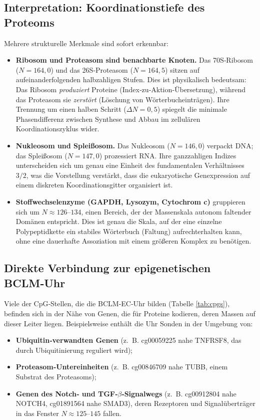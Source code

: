 \documentclass[12pt,a4paper]{article}
\begin{document}
	\subsection{Interpretation: Koordinationstiefe des Proteoms}
	
	Mehrere strukturelle Merkmale sind sofort erkennbar:
	\begin{itemize}
		\item \textbf{Ribosom und Proteasom sind benachbarte Knoten.} Das 70S‑Ribosom (\(N=164,0\)) und das 26S‑Proteasom (\(N=164,5\)) sitzen auf aufeinanderfolgenden halbzahligen Stufen. Dies ist physikalisch bedeutsam: Das Ribosom \emph{produziert} Proteine (Index‑zu‑Aktion‑Übersetzung), während das Proteasom sie \emph{zerstört} (Löschung von Wörterbucheinträgen). Ihre Trennung um einen halben Schritt (\(\Delta N = 0,5\)) spiegelt die minimale Phasendifferenz zwischen Synthese und Abbau im zellulären Koordinationszyklus wider.
		\item \textbf{Nukleosom und Spleißosom.} Das Nukleosom (\(N=146,0\)) verpackt DNA; das Spleißosom (\(N=147,0\)) prozessiert RNA. Ihre ganzzahligen Indizes unterscheiden sich um genau eine Einheit des fundamentalen Verhältnisses \(3/2\), was die Vorstellung verstärkt, dass die eukaryotische Genexpression auf einem diskreten Koordinationsgitter organisiert ist.
		\item \textbf{Stoffwechselenzyme (GAPDH, Lysozym, Cytochrom c)} gruppieren sich um \(N \approx 126\)--\(134\), einen Bereich, der der Massenskala autonom faltender Domänen entspricht. Dies ist genau die Skala, auf der eine einzelne Polypeptidkette ein stabiles Wörterbuch (Faltung) aufrechterhalten kann, ohne eine dauerhafte Assoziation mit einem größeren Komplex zu benötigen.
	\end{itemize}
	
	\subsection{Direkte Verbindung zur epigenetischen BCLM‑Uhr}
	
	Viele der CpG‑Stellen, die die BCLM‑EC‑Uhr bilden (Tabelle \ref{tab:cpgs}), befinden sich in der Nähe von Genen, die für Proteine kodieren, deren Massen auf dieser Leiter liegen. Beispielsweise enthält die Uhr Sonden in der Umgebung von:
	\begin{itemize}
		\item \textbf{Ubiquitin‑verwandten Genen} (z.~B. cg00059225 nahe TNFRSF8, das durch Ubiquitinierung reguliert wird);
		\item \textbf{Proteasom‑Untereinheiten} (z.~B. cg00846709 nahe TUBB, einem Substrat des Proteasoms);
		\item \textbf{Genen des Notch‑ und TGF‑\(\beta\)‑Signalwegs} (z.~B. cg00912804 nahe NOTCH4, cg01891564 nahe SMAD3), deren Rezeptoren und Signalüberträger in das Fenster \(N \approx 125\)--\(145\) fallen.
	\end{itemize}
	
\end{document}
